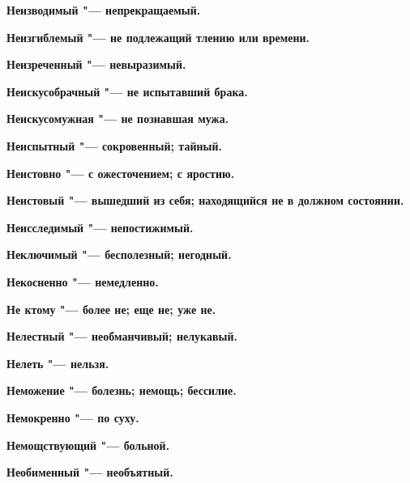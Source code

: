 \begin{multicols}{2}
\bfseries Неизводимый\normalfont{} "--- непрекращаемый. 




\bfseries Неизгиблемый\normalfont{} "--- не подлежащий тлению или времени. 




\bfseries Неизреченный\normalfont{} "--- невыразимый. 




\bfseries Неискусобрачный\normalfont{} "--- не испытавший брака. 




\bfseries Неискусомужная\normalfont{} "--- не познавшая мужа. 




\bfseries Неиспытный\normalfont{} "--- сокровенный; тайный. 




\bfseries Неистовно\normalfont{} "--- с ожесточением; с яростию. 




\bfseries Неистовый\normalfont{} "--- вышедший из себя; находящийся не в должном состоянии. 




\bfseries Неисследимый\normalfont{} "--- непостижимый. 




\bfseries Неключимый\normalfont{} "--- бесполезный; негодный. 




\bfseries Некосненно\normalfont{} "--- немедленно. 




\bfseries Не ктому\normalfont{} "--- более не; еще не; уже не. 




\bfseries Нелестный\normalfont{} "--- необманчивый; нелукавый. 




\bfseries Нелеть\normalfont{} "--- нельзя. 




\bfseries Неможение\normalfont{} "--- болезнь; немощь; бессилие. 




\bfseries Немокренно\normalfont{} "--- по суху. 




\bfseries Немощствующий\normalfont{} "--- больной. 




\bfseries Необименный\normalfont{} "--- необъятный. 





\end{multicols}
